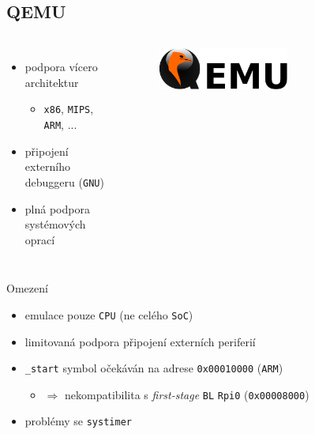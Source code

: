 \documentclass[compress]{beamer}
\begin{document}
\subsection{QEMU}

\begin{frame}
	\begin{columns}
		\begin{itemize}
			\item podpora vícero architektur
			\begin{itemize}
				\item \texttt{x86}, \texttt{MIPS}, \texttt{ARM}, ...
			\end{itemize}
			\item připojení externího debuggeru (\texttt{GNU})
			\item plná podpora systémových oprací
		\end{itemize}
		\begin{figure}
			\centering
			\includegraphics[width=0.6\textwidth]{img/Qemu_logo.pdf}
			\caption{\href{https://www.qemu.org}{}}
			\label{QEMU}
		\end{figure}
	\end{columns}
	\vspace{0.4cm}
	\noindent\makebox[\linewidth]{\rule{\textwidth}{0.4pt}}
	\begin{block}{Omezení}
		\begin{itemize}
			\item emulace pouze \texttt{CPU} (ne celého \texttt{SoC})
			\item limitovaná podpora připojení externích periferií
			\item \texttt{\_start} symbol očekáván na adrese \texttt{0x00010000} (\texttt{ARM})
			\begin{itemize}
				\item $\Rightarrow$ nekompatibilita s \textit{first-stage} \texttt{BL} \texttt{Rpi0} (\texttt{0x00008000})
			\end{itemize}
			\item problémy se \texttt{systimer}
		\end{itemize}
	\end{block}
\end{frame}
\end{document}

